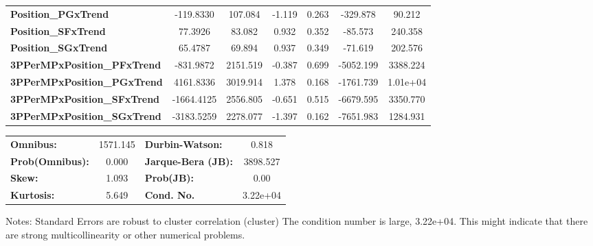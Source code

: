 \begin{center}
\begin{tabular}{lcccccc}
\textbf{Position\_PGxTrend}         &    -119.8330  &      107.084     &    -1.119  &         0.263        &     -329.878    &       90.212     \\
\textbf{Position\_SFxTrend}         &      77.3926  &       83.082     &     0.932  &         0.352        &      -85.573    &      240.358     \\
\textbf{Position\_SGxTrend}         &      65.4787  &       69.894     &     0.937  &         0.349        &      -71.619    &      202.576     \\
\textbf{3PPerMPxPosition\_PFxTrend} &    -831.9872  &     2151.519     &    -0.387  &         0.699        &    -5052.199    &     3388.224     \\
\textbf{3PPerMPxPosition\_PGxTrend} &    4161.8336  &     3019.914     &     1.378  &         0.168        &    -1761.739    &     1.01e+04     \\
\textbf{3PPerMPxPosition\_SFxTrend} &   -1664.4125  &     2556.805     &    -0.651  &         0.515        &    -6679.595    &     3350.770     \\
\textbf{3PPerMPxPosition\_SGxTrend} &   -3183.5259  &     2278.077     &    -1.397  &         0.162        &    -7651.983    &     1284.931     \\
\bottomrule
\end{tabular}
\begin{tabular}{lclc}
\textbf{Omnibus:}       & 1571.145 & \textbf{  Durbin-Watson:     } &    0.818  \\
\textbf{Prob(Omnibus):} &   0.000  & \textbf{  Jarque-Bera (JB):  } & 3898.527  \\
\textbf{Skew:}          &   1.093  & \textbf{  Prob(JB):          } &     0.00  \\
\textbf{Kurtosis:}      &   5.649  & \textbf{  Cond. No.          } & 3.22e+04  \\
\bottomrule
\end{tabular}
\end{center}

Notes: \newline
 [1] Standard Errors are robust to cluster correlation (cluster) \newline
 [2] The condition number is large, 3.22e+04. This might indicate that there are \newline
 strong multicollinearity or other numerical problems.